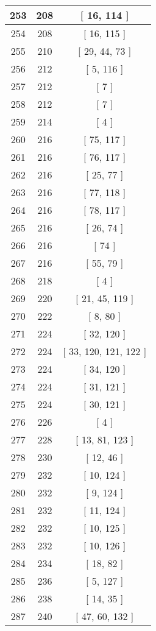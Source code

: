 \begin{center}
\begin{longtable}[H]{|| c c c ||}
\hline
253 & 208 & [ 16, 114 ] \\ 
\hline
254 & 208 & [ 16, 115 ] \\ 
\hline
255 & 210 & [ 29, 44, 73 ] \\ 
\hline
256 & 212 & [ 5, 116 ] \\ 
\hline
257 & 212 & [ 7 ] \\ 
\hline
258 & 212 & [ 7 ] \\ 
\hline
259 & 214 & [ 4 ] \\ 
\hline
260 & 216 & [ 75, 117 ] \\ 
\hline
261 & 216 & [ 76, 117 ] \\ 
\hline
262 & 216 & [ 25, 77 ] \\ 
\hline
263 & 216 & [ 77, 118 ] \\ 
\hline
264 & 216 & [ 78, 117 ] \\ 
\hline
265 & 216 & [ 26, 74 ] \\ 
\hline
266 & 216 & [ 74 ] \\ 
\hline
267 & 216 & [ 55, 79 ] \\ 
\hline
268 & 218 & [ 4 ] \\ 
\hline
269 & 220 & [ 21, 45, 119 ] \\ 
\hline
270 & 222 & [ 8, 80 ] \\ 
\hline
271 & 224 & [ 32, 120 ] \\ 
\hline
272 & 224 & [ 33, 120, 121, 122 ] \\ 
\hline
273 & 224 & [ 34, 120 ] \\ 
\hline
274 & 224 & [ 31, 121 ] \\ 
\hline
275 & 224 & [ 30, 121 ] \\ 
\hline
276 & 226 & [ 4 ] \\ 
\hline
277 & 228 & [ 13, 81, 123 ] \\ 
\hline
278 & 230 & [ 12, 46 ] \\ 
\hline
279 & 232 & [ 10, 124 ] \\ 
\hline
280 & 232 & [ 9, 124 ] \\ 
\hline
281 & 232 & [ 11, 124 ] \\ 
\hline
282 & 232 & [ 10, 125 ] \\ 
\hline
283 & 232 & [ 10, 126 ] \\ 
\hline
284 & 234 & [ 18, 82 ] \\ 
\hline
285 & 236 & [ 5, 127 ] \\ 
\hline
286 & 238 & [ 14, 35 ] \\ 
\hline
287 & 240 & [ 47, 60, 132 ] \\ 

\end{longtable}
\end{center}
